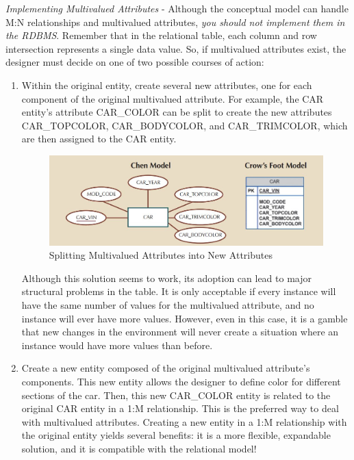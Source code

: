 \documentclass[a4paper, 12pt, titlepage]{report}
\begin{document}
{\begin{figure}[H]
\end{figure}
\noindent\emph{Implementing Multivalued Attributes} - Although the conceptual model can handle M:N relationships and multivalued attributes, \emph{you should not implement them in the
RDBMS}. Remember that in the relational table, each column and row intersection represents a single data value. So, if multivalued attributes exist, the designer must decide on one of two possible courses of action:
\begin{enumerate}
\item Within the original entity, create several new attributes, one for each component of the original multivalued attribute. For example, the CAR entity’s attribute CAR\_COLOR
can be split to create the new attributes CAR\_TOPCOLOR, CAR\_BODYCOLOR, and CAR\_TRIMCOLOR, which are then assigned to the CAR entity. \\
\begin{figure}[H]
\centering
\includegraphics[scale=0.5]{Attr3}
\caption{Splitting Multivalued Attributes into New Attributes}
\end{figure}
Although this solution seems to work, its adoption can lead to major structural problems in the table. It is only acceptable if every instance will have the same number of values for the multivalued attribute, and no instance will ever have more values. However, even in this case, it is a gamble that new changes in the environment will never create a situation where an instance would have more values than before.
\item Create a new entity composed of the original multivalued attribute’s components. This new entity allows the designer to define color for different sections of the car. Then, this new CAR\_COLOR entity is related to the original CAR entity in a 1:M relationship. This is the preferred way to deal with multivalued attributes. Creating a new entity in a 1:M relationship with the original entity yields several benefits: it is a more flexible, expandable solution, and it is compatible with the relational model!
\begin{figure}[H]

\end{figure}
\end{enumerate}}
\end{document}
